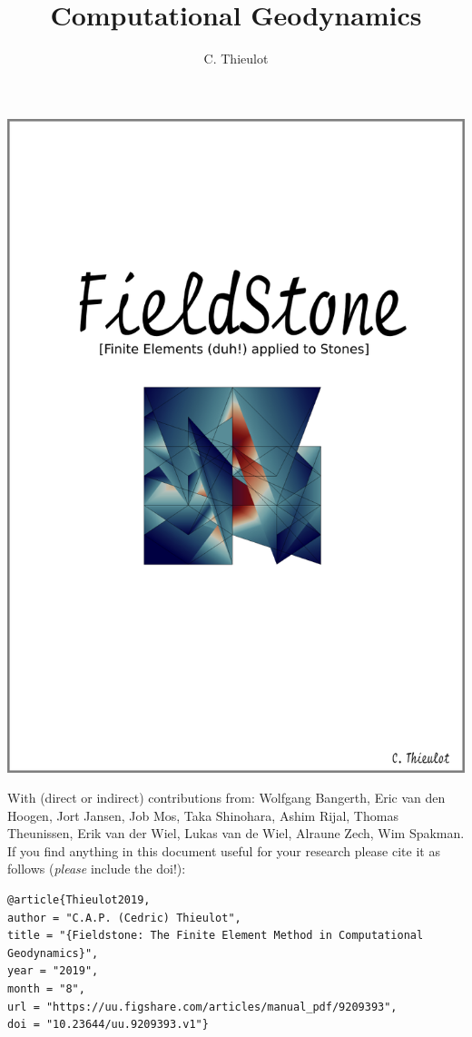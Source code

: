 \documentclass[a4paper]{article}
\title{Computational Geodynamics}
\author{C. Thieulot}
\begin{document}
\thispagestyle{empty}
\includegraphics[width=0.95\linewidth]{images/frontpage.png}

{\scriptsize With (direct or indirect) contributions from: 
Wolfgang Bangerth, 
Eric van den Hoogen, 
Jort Jansen,
Job Mos, 
Taka Shinohara, 
Ashim Rijal,
Thomas Theunissen,
Erik van der Wiel, 
Lukas van de Wiel, 
Alraune Zech, 
Wim Spakman.}
\newpage
If you find anything in this document useful for your research please cite it 
as follows ({\it please} include the doi!):

\begin{verbatim}
@article{Thieulot2019,
author = "C.A.P. (Cedric) Thieulot",
title = "{Fieldstone: The Finite Element Method in Computational Geodynamics}",
year = "2019",
month = "8",
url = "https://uu.figshare.com/articles/manual_pdf/9209393",
doi = "10.23644/uu.9209393.v1"}
\end{verbatim}


\end{document}
